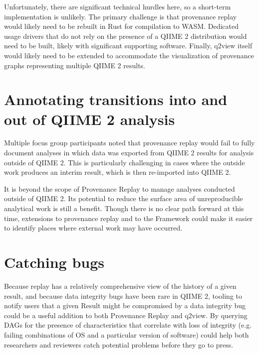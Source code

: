 Unfortunately, there are significant technical hurdles here, so a short-term
implementation is unlikely. The primary challenge is that provenance replay
would likely need to be rebuilt in Rust for compilation to WASM. Dedicated usage
drivers that do not rely on the presence of a QIIME 2 distribution would need to
be built, likely with significant supporting software. Finally, q2view itself
would likely need to be extended to accommodate the visualization of provenance
graphs representing multiple QIIME 2 results.

\section{Annotating transitions into and out of QIIME 2 analysis \parencite[Issue 80]{keefe_issues_2021}}
Multiple focus group participants noted that provenance replay would fail to
fully document analyses in which data was exported from QIIME 2 results for
analysis outside of QIIME 2. This is particularly challenging in cases where the
outside work produces an interim result, which is then re-imported into QIIME 2.

It is beyond the scope of Provenance Replay to manage analyses conducted outside
of QIIME 2. Its potential to reduce the surface area of unreproducible
analytical work is still a benefit. Though there is no clear path forward at
this time, extensions to provenance replay and to the Framework could make it
easier to identify places where external work may have occurred.

\section{Catching bugs}
Because replay has a relatively comprehensive view of the history of a given
result, and because data integrity bugs have been rare in QIIME 2, tooling to
notify users that a given Result might be compromised by a data integrity bug
could be a useful addition to both Provenance Replay and q2view. By querying
DAGs for the presence of characteristics that correlate with loss of integrity
(e.g. failing combinations of OS and a particular version of software) could
help both researchers and reviewers catch potential problems before they go to
press.
